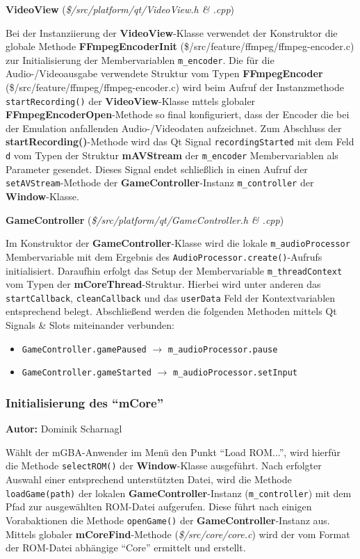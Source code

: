 \documentclass[11pt,a4paper]{scrartcl}
\newcommand{\AutorDominik} {
    \vspace{-4mm}
    \large \textbf{Autor:} Dominik Scharnagl \normalsize
    \vspace{2mm}
}
\newcommand{\paratitlecode}[2] {
    \vspace{5mm}
    \large \textbf{#1} \normalsize(\textit{\${#2}})
    \vspace{2mm}\newline
}
\begin{document}
\paratitlecode{VideoView}{/src/platform/qt/VideoView.h \& .cpp}
Bei der Instanziierung der \textbf{VideoView}-Klasse verwendet der Konstruktor die globale Methode \textbf{FFmpegEncoderInit} (\$/src/feature/ffmpeg/ffmpeg-encoder.c) zur Initialisierung der Membervariablen \verb|m_encoder|. Die f\"ur die Audio-/Videoausgabe verwendete Struktur vom Typen \textbf{FFmpegEncoder} (\$/src/feature/ffmpeg/ffmpeg-encoder.c) wird beim Aufruf der Instanzmethode \verb|startRecording()| der \textbf{VideoView}-Klasse mttels globaler \textbf{FFmpegEncoderOpen}-Methode so final konfiguriert, dass der Encoder die bei der Emulation anfallenden Audio-/Videodaten aufzeichnet. Zum Abschluss der \textbf{startRecording()}-Methode wird das Qt Signal \verb|recordingStarted| mit dem Feld \verb|d| vom Typen der Struktur \textbf{mAVStream} der \verb|m_encoder| Membervariablen als Parameter gesendet. Dieses Signal endet schlie{\ss}lich in einen Aufruf der \verb|setAVStream|-Methode der \textbf{GameController}-Instanz \verb|m_controller| der \textbf{Window}-Klasse.


\paratitlecode{GameController}{/src/platform/qt/GameController.h \& .cpp}
Im Konstruktor der \textbf{GameController}-Klasse wird die lokale \verb|m_audioProcessor| Membervariable mit dem Ergebnis des \verb|AudioProcessor.create()|-Aufrufs initialisiert. Daraufhin erfolgt das Setup der Membervariable \verb|m_threadContext| vom Typen der \textbf{mCoreThread}-Struktur. Hierbei wird unter anderen das \verb|startCallback|, \verb|cleanCallback| und das \verb|userData| Feld der Kontextvariablen entsprechend belegt. Abschlie{\ss}end werden die folgenden Methoden mittels Qt Signals \& Slots miteinander verbunden:

\begin{itemize}
    \item \verb|GameController.gamePaused| $\rightarrow$ \verb|m_audioProcessor.pause|
    \item \verb|GameController.gameStarted| $\rightarrow$ \verb|m_audioProcessor.setInput|
\end{itemize}

\newpage
\subsubsection{Initialisierung des \enquote{mCore}}
\AutorDominik

W\"ahlt der mGBA-Anwender im Men\"u den Punkt \enquote{Load ROM...}, wird hierf\"ur die Methode \verb|selectROM()| der \textbf{Window}-Klasse ausgef\"uhrt. Nach erfolgter Auswahl einer entsprechend unterst\"utzten Datei, wird die Methode \verb|loadGame(path)|  der lokalen \textbf{GameController}-Instanz (\verb|m_controller|) mit dem Pfad zur ausgew\"ahlten ROM-Datei aufgerufen. Diese f\"uhrt nach einigen Vorabaktionen die Methode \verb|openGame()| der \textbf{GameController}-Instanz aus. Mittels globaler \textbf{mCoreFind}-Methode (\textit{\$/src/core/core.c}) wird der vom Format der ROM-Datei abh\"angige \enquote{Core} ermittelt und erstellt.
\end{document}
